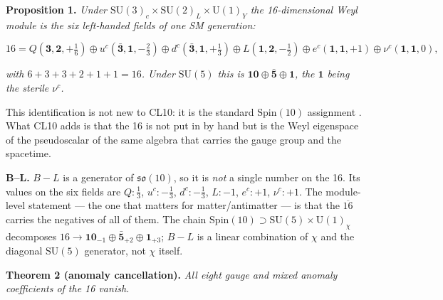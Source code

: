 \documentclass[aps,prd,amsmath,amssymb,superscriptaddress,longbibliography,floatfix,preprint]{revtex4-2}
\begin{document}
\textbf{Proposition 1.} \emph{Under $\mathrm{SU}(3)_c\times\mathrm{SU}(2)_L\times\mathrm{U}(1)_Y$ the 16-dimensional Weyl module is the six left-handed fields of one SM generation:}

\[16 = Q(\mathbf{3},\mathbf{2},+\tfrac16) \oplus u^c(\bar{\mathbf{3}},\mathbf{1},-\tfrac23) \oplus d^c(\bar{\mathbf{3}},\mathbf{1},+\tfrac13) \oplus L(\mathbf{1},\mathbf{2},-\tfrac12) \oplus e^c(\mathbf{1},\mathbf{1},+1) \oplus \nu^c(\mathbf{1},\mathbf{1},0),\]

\emph{with $6+3+3+2+1+1 = 16$. Under $\mathrm{SU}(5)$ this is $\mathbf{10}\oplus\bar{\mathbf{5}}\oplus\mathbf{1}$, the $\mathbf{1}$ being the sterile $\nu^c$.}

This identification is not new to CL10: it is the standard $\mathrm{Spin}(10)$ assignment \cite{ref06,ref07,ref08,ref09,ref12}. What CL10 adds is that the 16 is not put in by hand but is the Weyl eigenspace of the pseudoscalar of the same algebra that carries the gauge group and the spacetime.

\textbf{B--L.} $B-L$ is a generator of $\mathfrak{so}(10)$, so it is \emph{not} a single number on the 16. Its values on the six fields are $Q: \tfrac13$, $u^c: -\tfrac13$, $d^c: -\tfrac13$, $L: -1$, $e^c: +1$, $\nu^c: +1$. The module-level statement --- the one that matters for matter/antimatter --- is that the $\overline{16}$ carries the negatives of all of them. The chain $\mathrm{Spin}(10) \supset \mathrm{SU}(5)\times \mathrm{U}(1)_\chi$ decomposes $16 \to \mathbf{10}_{-1}\oplus\bar{\mathbf{5}}_{+2}\oplus\mathbf{1}_{+3}$; $B-L$ is a linear combination of $\chi$ and the diagonal $\mathrm{SU}(5)$ generator, not $\chi$ itself.

\textbf{Theorem 2 (anomaly cancellation).} \emph{All eight gauge and mixed anomaly coefficients of the 16 vanish.}
\end{document}
